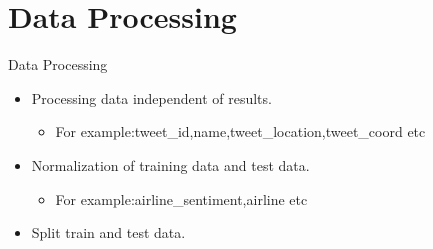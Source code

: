 \documentclass[
 size=14pt,
 paper=smartboard,  %
 mode=present, 		%
 display=slides, 	%
 style=tuliplab,  	%
 pauseslide,
 fleqn,leqno]{powerdot}
\begin{document}


\section{Data Processing}


\begin{slide}[toc=,bm=]{Data Processing}
  \begin{itemize}
    \item Processing data independent of results.
      \begin{itemize}
        \item For example:tweet_id,name,tweet_location,tweet_coord etc
      \end{itemize}
    \item  Normalization of training data and test data.
      \begin{itemize}
        \item For example:airline_sentiment,airline etc
      \end{itemize}
    \item Split train and test data.
  \end{itemize}
\end{slide}
\end{document}
